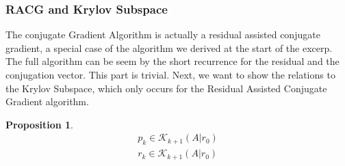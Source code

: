 \documentclass[]{article}
\theoremstyle{definition}
\newtheorem{prop}{Proposition}[section]  %
\begin{document}
        \subsubsection{RACG and Krylov Subspace}\label{sec:RACG_and_Krylov_Subspace}
            The conjugate Gradient Algorithm is actually a residual assisted conjugate gradient, a special case of the algorithm we derived at the start of the excerp. The full algorithm can be seem by the short recurrence for the residual and the conjugation vector. This part is trivial. Next, we want to show the relations to the Krylov Subspace, which only occurs for the Residual Assisted Conjugate Gradient algorithm. 
            \begin{prop}
                \begin{align}
                    p_k \in \mathcal K_{k + 1}(A|r_0)
                    \\
                    r_k \in \mathcal K_{k + 1}(A|r_0)
                \end{align}    
            \end{prop}
\end{document}
